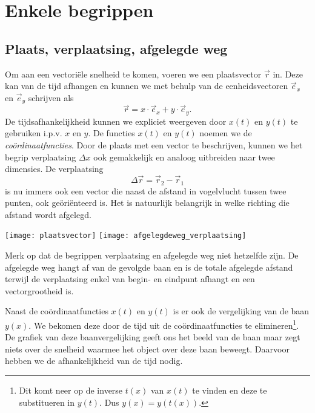 \documentclass{ximera}
\begin{document}
	\author{Bart Lambregs}
    \xmsource




	\section{Enkele begrippen}

	\subsection{Plaats, verplaatsing, afgelegde weg}
	
	Om aan een vectori\"ele snelheid te komen, voeren we een plaatsvector $\vec{r}$ in. Deze kan van de tijd afhangen en kunnen we met behulp van de eenheidsvectoren $\vec{e}_x$ en $\vec{e}_y$ schrijven als
	\begin{equation*}
	 \vec{r}=x\cdot\vec{e}_x+y\cdot\vec{e}_y.
	\end{equation*}
	De tijdsafhankelijkheid kunnen we expliciet weergeven door $x(t)$ en $y(t)$ te gebruiken i.p.v. $x$ en $y$. De functies $x(t)$ en $y(t)$ noemen we de \emph{co\"ordinaat\-functies}. Door de plaats met een vector te beschrijven, kunnen we het begrip verplaatsing $\Delta x$ ook gemakkelijk en analoog uitbreiden naar twee dimensies. De verplaatsing
	\begin{equation*}
	\Delta\vec{r}=\vec{r}_2-\vec{r}_1
	\end{equation*}
	is nu immers ook een vector die naast de afstand in vogelvlucht tussen twee punten, ook ge\"ori\"enteerd is. Het is natuurlijk belangrijk in welke richting die afstand wordt afgelegd.
	\begin{image}
	
	\texttt{[image: plaatsvector]}
	\texttt{[image: afgelegdeweg\_verplaatsing]}
	\end{image}
	Merk op dat de begrippen verplaatsing en afgelegde weg niet hetzelfde zijn. De afgelegde weg hangt af van de gevolgde baan en is de totale afgelegde afstand terwijl de verplaatsing enkel van begin- en eindpunt afhangt en een vectorgrootheid is.
	
	Naast de co\"ordinaatfuncties $x(t)$ en $y(t)$ is er ook de vergelijking van de baan $y(x)$. We bekomen deze door de tijd uit de co\"ordinaatfuncties te elimineren\footnote{Dit komt neer op de inverse $t(x)$ van $x(t)$ te vinden en deze te substitueren in $y(t)$. Dus $y(x)=y(t(x))$.}. De grafiek van deze baanvergelijking geeft ons het beeld van de baan maar zegt niets over de snelheid waarmee het object over deze baan beweegt. Daarvoor hebben we de afhankelijkheid van de tijd nodig.
	
\end{document}
